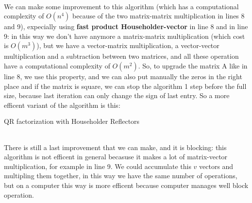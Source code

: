 \documentclass{article}
\begin{document}
\\We can make some improvement to this algorithm (which has a computational complexity of $O(n^4)$ because of the two matrix-matrix multiplication in lines 8 and 9), expecially using \textbf{fast product Householder-vector} in line 8 and in line 9: in this way we don't have anymore a matrix-matrix multiplication (which cost is $O(m^3)$), but we have a vector-matrix multiplication, a vector-vector multiplication and a subtraction between two matrices, and all these operation have a computational complexity of $O(m^2)$. So, to upgrade the matrix A like in line 8, we use this property, and we can also put manually the zeros in the right place and if the matrix is square, we can stop the algorithm 1 step before the full size, because last iteration can only change the sign of last entry. So a more efficent variant of the algorithm is this:
\makeatletter
\def\BState{\State\hskip-\ALG@thistlm}
\makeatother
\begin{algorithm}
\caption{QR factorization with Householder Reflectors}\label{euclid}
\end{algorithm}
\\There is still a last improvement that we can make, and it is blocking: this algorithm is not efficent in general becasuse it makes a lot of matrix-vector multiplication, for example in line 9. We could accumulate this $v$ vectors and multipling them together, in this way we have the same number of operations, but on a computer this way is more efficent because computer manages well block operation.
\makeatletter
\def\BState{\State\hskip-\ALG@thistlm}
\makeatother
\end{document}

